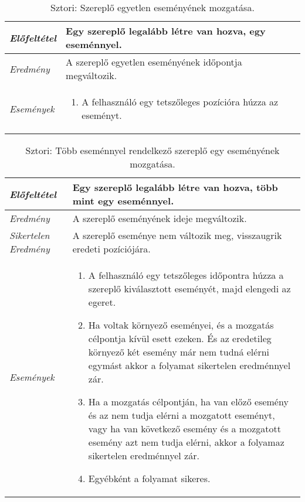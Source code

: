\begin{table}[H]
	\centering
	\begin{tabular}{ | m{} | m{} | }
		\hline
		\emph{Előfeltétel} & Egy szereplő legalább létre van hozva, egy eseménnyel.\\
		\hline
		\emph{Eredmény} & A szereplő egyetlen eseményének időpontja megváltozik. \\
		\hline
		\hline
		\emph{Események} &
		\begin{enumerate}[itemsep=-1ex]
			\item A felhasználó egy tetszőleges pozícióra húzza az eseményt.
		\end{enumerate}
		\\
		\hline
	\end{tabular}
	\caption{Sztori: Szereplő egyetlen eseményének mozgatása.}
	\label{tab:story-timeline-pan-actor-single-event}
\end{table}


\begin{table}[H]
	\centering
	\begin{tabular}{ | m{} | m{} | }
		\hline
		\emph{Előfeltétel} & Egy szereplő legalább létre van hozva, több mint egy eseménnyel.\\
		\hline
		\emph{Eredmény} & A szereplő eseményének ideje megváltozik. \\
		\hline
		\emph{Sikertelen Eredmény} & A szereplő eseménye nem változik meg, visszaugrik eredeti pozíciójára. \\
		\hline
		\hline
		\emph{Események} &
		\begin{enumerate}[itemsep=-1ex]
			\item A felhasználó egy tetszőleges időpontra húzza a szereplő kiválasztott eseményét, majd elengedi az egeret.
			\item Ha voltak környező eseményei, és a mozgatás célpontja kívül esett ezeken. És az eredetileg környező két esemény már nem tudná elérni egymást akkor a folyamat sikertelen eredménnyel zár.
			\item Ha a mozgatás célpontján, ha van előző esemény és az nem tudja elérni a mozgatott eseményt, vagy ha van következő esemény és a mozgatott esemény azt nem tudja elérni, akkor a folyamaz sikertelen eredménnyel zár.
			\item Egyébként a folyamat sikeres.
		\end{enumerate}
		\\
		\hline
	\end{tabular}
	\caption{Sztori: Több eseménnyel rendelkező szereplő egy eseményének mozgatása.}
	\label{tab:story-timeline-pan-actor-more-event}
\end{table}


